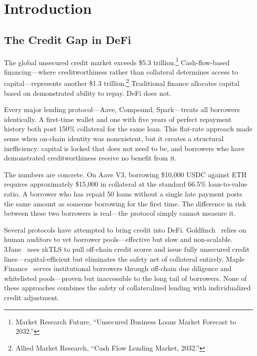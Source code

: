 \documentclass[11pt,a4paper]{article}
\begin{document}
\vspace{1em}

\section{Introduction}

\subsection{The Credit Gap in DeFi}

The global unsecured credit market exceeds \$5.3 trillion.\footnote{Market Research Future, ``Unsecured Business Loans Market Forecast to 2032.''} Cash-flow-based financing---where creditworthiness rather than collateral determines access to capital---represents another \$1.3 trillion.\footnote{Allied Market Research, ``Cash Flow Lending Market, 2032.''} Traditional finance allocates capital based on demonstrated ability to repay. DeFi does not.

Every major lending protocol---Aave, Compound, Spark---treats all borrowers identically. A first-time wallet and one with five years of perfect repayment history both post 150\% collateral for the same loan. This flat-rate approach made sense when on-chain identity was nonexistent, but it creates a structural inefficiency: capital is locked that does not need to be, and borrowers who have demonstrated creditworthiness receive no benefit from it.

The numbers are concrete. On Aave V3, borrowing \$10{,}000 USDC against ETH requires approximately \$15{,}000 in collateral at the standard 66.5\% loan-to-value ratio. A borrower who has repaid 50 loans without a single late payment posts the same amount as someone borrowing for the first time. The difference in risk between these two borrowers is real---the protocol simply cannot measure it.

Several protocols have attempted to bring credit into DeFi. Goldfinch~\cite{goldfinch} relies on human auditors to vet borrower pools---effective but slow and non-scalable. 3Jane~\cite{threejane} uses zkTLS to pull off-chain credit scores and issue fully unsecured credit lines---capital-efficient but eliminates the safety net of collateral entirely. Maple Finance~\cite{maple} serves institutional borrowers through off-chain due diligence and whitelisted pools---proven but inaccessible to the long tail of borrowers. None of these approaches combines the safety of collateralized lending with individualized credit adjustment.
\end{document}
